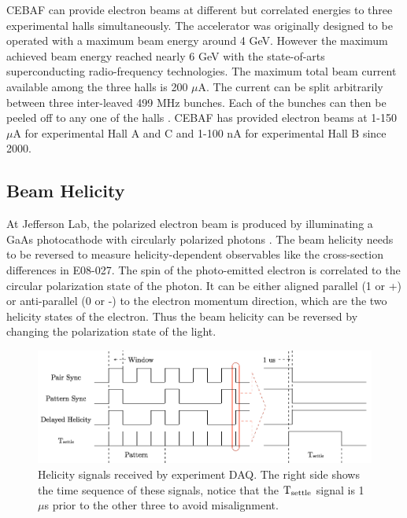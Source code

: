 CEBAF can provide electron beams at different but correlated energies to three experimental halls simultaneously. The accelerator was originally designed to be operated with a maximum beam energy around 4 GeV. However the maximum achieved beam energy reached nearly 6 GeV with the state-of-arts superconducting radio-frequency technologies. The maximum total beam current available among the three halls is 200 $\mu$A. The current can be split arbitrarily between three inter-leaved 499 MHz bunches. Each of the bunches can then be peeled off to any one of the halls \cite{Sulkosky2007}. CEBAF has provided electron beams at 1-150 $\mu$A for experimental Hall A and C and 1-100 nA for experimental Hall B since 2000.

\subsection{Beam Helicity}
\label{C5S1SS2}

At Jefferson Lab, the polarized electron beam is produced by illuminating a GaAs photocathode with circularly polarized photons \cite{Gross2011}. The beam helicity needs to be reversed to measure helicity-dependent observables like the cross-section differences in E08-027. The spin of the photo-emitted electron is correlated to the circular polarization state of the photon. It can be either aligned parallel (1 or +) or anti-parallel (0 or -) to the electron momentum direction, which are the two helicity states of the electron. Thus the beam helicity can be reversed by changing the polarization state of the light.

\begin{figure}[b!]
  \centering
  \includegraphics[width=\textwidth]{figs/helicity-signal.png}
  \caption[Helicity signals received by experiment DAQ.]{Helicity signals received by experiment DAQ. The right side shows the time sequence of these signals, notice that the $\mathrm{T}_{\mathrm{settle}}$ signal is 1 $\mu$s prior to the other three to avoid misalignment. \label{C5S1F2}}
\end{figure}

